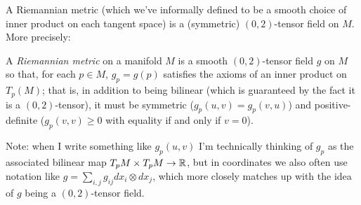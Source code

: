 \begin{example}
	A Riemannian metric (which we've informally defined to be a smooth choice of inner product on each tangent space) is a (symmetric) $(0,2)$-tensor field on $M$. More precisely:
	
	\begin{definition}\label{def:Riemannian metric}
		A \emph{Riemannian metric} on a manifold $M$ is a smooth $(0,2)$-tensor field $g$ on $M$ so that, for each $p \in M$, $g_p = g(p)$ satisfies the axioms of an inner product on $T_p(M)$; that is, in addition to being bilinear (which is guaranteed by the fact it is a $(0,2)$-tensor), it must be symmetric ($g_p(u,v) = g_p(v,u)$) and positive-definite ($g_p(v,v) \geq 0$ with equality if and only if $v=0$).
	\end{definition} 
	
	Note: when I write something like $g_p(u,v)$ I'm technically thinking of $g_p$ as the associated bilinear map $T_pM \times T_pM \to \mathbb{R}$, but in coordinates we also often use notation like $g = \sum_{i,j} g_{ij} dx_i \otimes dx_j$, which more closely matches up with the idea of $g$ being a $(0,2)$-tensor field.
\end{example}

